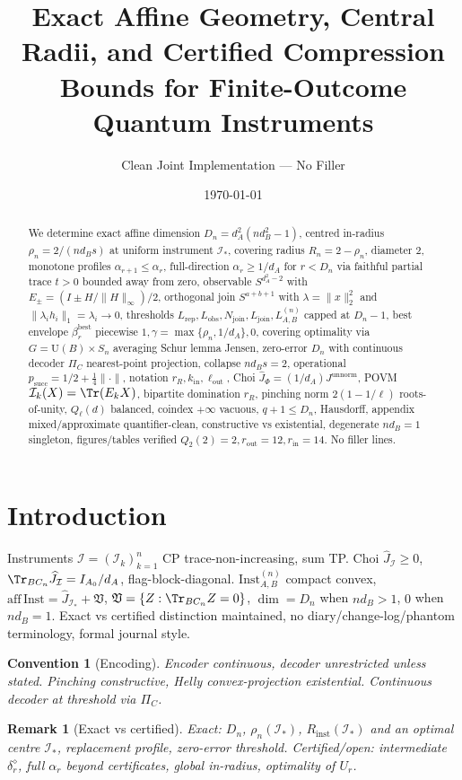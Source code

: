 \documentclass[11pt,a4paper]{article}
\title{\bf Exact Affine Geometry, Central Radii, and Certified Compression Bounds for Finite-Outcome Quantum Instruments}
\author{Clean Joint Implementation --- No Filler}
\date{\today}
\newtheorem{remark}[theorem]{Remark}
\newtheorem{convention}[theorem]{Convention}
\newcommand{\Inst}{\mathrm{Inst}}
\begin{document}
\maketitle
\begin{abstract}
We determine exact affine dimension $D_n=d_A^2(nd_B^2-1)$, centred in-radius $\rho_n=2/(nd_Bs)$ at uniform instrument $\mathcal I_*$, covering radius $R_n=2-\rho_n$, diameter $2$, monotone profiles $\alpha_{r+1}\le\alpha_r$, full-direction $\alpha_r\ge1/d_A$ for $r<D_n$ via faithful partial trace $t>0$ bounded away from zero, observable $S^{d_A^2-2}$ with $E_\pm=(I\pm H/\|H\|_\infty)/2$, orthogonal join $S^{a+b+1}$ with $\lambda=\|x\|_2^2$ and $\|\lambda_i h_i\|_1=\lambda_i\to0$, thresholds $L_{\mathrm{rep}},L_{\mathrm{obs}},N_{\mathrm{join}},L_{\mathrm{join}},L_{A,B}^{(n)}$ capped at $D_n-1$, best envelope $\beta_r^{\mathrm{best}}$ piecewise $1,\gamma=\max\{\rho_n,1/d_A\},0$, covering optimality via $G=\mathrm U(B)\times S_n$ averaging Schur lemma Jensen, zero-error $D_n$ with continuous decoder $\Pi_C$ nearest-point projection, collapse $nd_Bs=2$, operational $p_{\mathrm{succ}}=1/2+\frac14\|\cdot\|$, notation $r_R,k_{\mathrm{in}},\ell_{\mathrm{out}}$, Choi $\widehat J_\Phi=(1/d_A)J^{\mathrm{unnorm}}$, POVM $\mathcal I_k(X)=\Tr(E_kX)$, bipartite domination $r_R$, pinching norm $2(1-1/\ell)$ roots-of-unity, $Q_\ell(d)$ balanced, coindex $+\infty$ vacuous, $q+1\le D_n$, Hausdorff, appendix mixed/approximate quantifier-clean, constructive vs existential, degenerate $nd_B=1$ singleton, figures/tables verified $Q_2(2)=2,r_{\mathrm{out}}=12,r_{\mathrm{in}}=14$. No filler lines.
\end{abstract}
\tableofcontents\newpage
\section{Introduction}
Instruments $\mathcal I=(\mathcal I_k)_{k=1}^n$ CP trace-non-increasing, sum TP.
Choi $\widehat J_{\mathcal I}\ge0$, $\Tr_{BC_n}\widehat J_{\mathcal I}=I_{A_0}/d_A$, flag-block-diagonal.
$\Inst_{A,B}^{(n)}$ compact convex, $\mathrm{aff}\,\Inst=\widehat J_{\mathcal I_*}+\mathfrak V$, $\mathfrak V=\{Z:\Tr_{BC_n}Z=0\}$, $\dim=D_n$ when $nd_B>1$, $0$ when $nd_B=1$.
Exact vs certified distinction maintained, no diary/change-log/phantom terminology, formal journal style.
\begin{convention}[Encoding]
Encoder continuous, decoder unrestricted unless stated. Pinching constructive, Helly convex-projection existential. Continuous decoder at threshold via $\Pi_C$.
\end{convention}
\begin{remark}[Exact vs certified]
Exact: $D_n$, $\rho_n(\mathcal I_*)$, $R_{\mathrm{inst}}(\mathcal I_*)$ and an optimal centre $\mathcal I_*$, replacement profile, zero-error threshold. Certified/open: intermediate $\delta_r^\diamond$, full $\alpha_r$ beyond certificates, global in-radius, optimality of $U_r$.
\end{remark}
\end{document}
